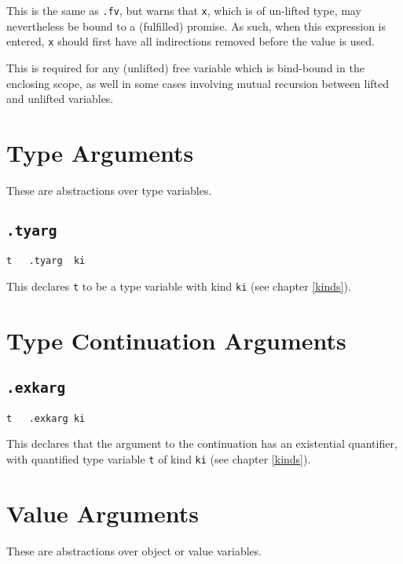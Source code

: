 \documentclass{report}
\newcommand\stringcode[1]{\texttt{#1}}
\begin{document}
This is the same as \stringcode{.fv}, but warns that \stringcode{x}, which is of un-lifted type, may nevertheless be bound to a (fulfilled) promise.
As such, when this expression is entered, \stringcode{x} should first have all indirections removed before the value is used.

This is required for any (unlifted) free variable which is bind-bound in the enclosing scope,
as well in some cases involving mutual recursion between lifted and unlifted variables.

\section{Type Arguments}
\label{code_type_arg}

These are abstractions over type variables.

\subsection{\stringcode{.tyarg}}

\begin{verbatim}
t	.tyarg	ki
\end{verbatim}

This declares \stringcode{t} to be a type variable with kind \stringcode{ki}  (see chapter \ref{kinds}).

\section{Type Continuation Arguments}
\label{cont_type_arg}

\subsection{\stringcode{.exkarg}}

\begin{verbatim}
t	.exkarg	ki
\end{verbatim}

This declares that the argument to the continuation has an existential quantifier,
with quantified type variable \stringcode{t} of kind \stringcode{ki}  (see chapter \ref{kinds}).

\section{Value Arguments}
\label{value_arg}

These are abstractions over object or value variables.
\end{document}

